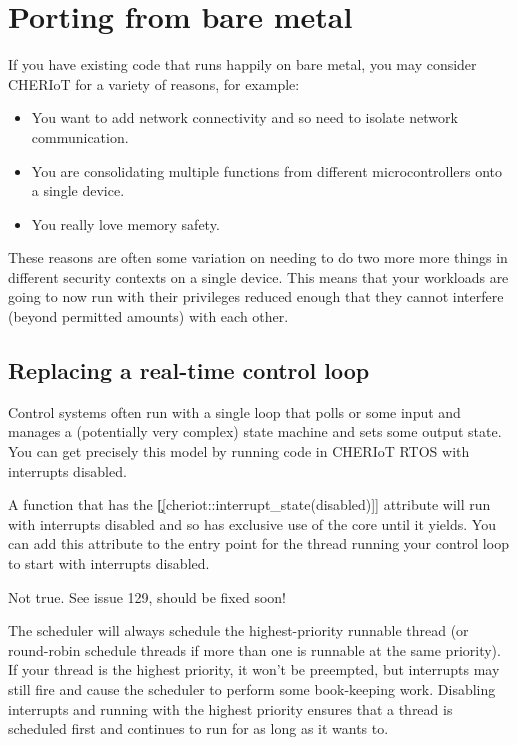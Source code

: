 \chapter{Porting from bare metal}

If you have existing code that runs happily on bare metal, you may consider CHERIoT for a variety of reasons, for example:

\begin{itemize}
	\item{You want to add network connectivity and so need to isolate network communication.}
	\item{You are consolidating multiple functions from different microcontrollers onto a single device.}
	\item{You really love memory safety.}
\end{itemize}

These reasons are often some variation on needing to do two more more things in different security contexts on a single device.
This means that your workloads are going to now run with their privileges reduced enough that they cannot interfere (beyond permitted amounts) with each other.

\section{Replacing a real-time control loop}

Control systems often run with a single loop that polls or some input and manages a (potentially very complex) state machine and sets some output state.
You can get precisely this model by running code in CHERIoT RTOS with interrupts disabled.

A function that has the \c{[[cheriot::interrupt_state(disabled)]]} attribute will run with interrupts disabled and so has exclusive use of the core until it yields.
You can add this attribute to the entry point for the thread running your control loop to start with interrupts disabled.

\begin{warning}
Not true.
See issue 129, should be fixed soon! 
\end{warning}

The scheduler will always schedule the highest-priority runnable thread (or round-robin schedule threads if more than one is runnable at the same priority).
If your thread is the highest priority, it won't be preempted, but interrupts may still fire and cause the scheduler to perform some book-keeping work.
Disabling interrupts and running with the highest priority ensures that a thread is scheduled first and continues to run for as long as it wants to.

